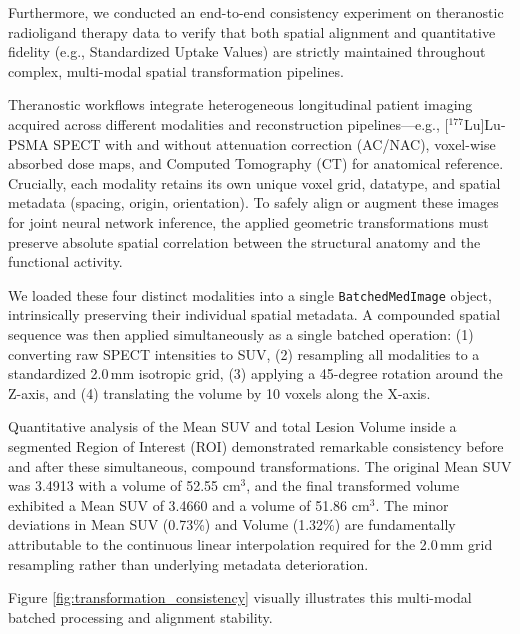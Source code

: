 \documentclass[10pt,letterpaper]{article}
\begin{document}
Furthermore, we conducted an end-to-end consistency experiment on theranostic radioligand therapy data to verify that both spatial alignment and quantitative fidelity (e.g., Standardized Uptake Values) are strictly maintained throughout complex, multi-modal spatial transformation pipelines.

Theranostic workflows integrate heterogeneous longitudinal patient imaging acquired across different modalities and reconstruction pipelines---e.g., [$^{177}$Lu]Lu-PSMA SPECT with and without attenuation correction (AC/NAC), voxel-wise absorbed dose maps, and Computed Tomography (CT) for anatomical reference. Crucially, each modality retains its own unique voxel grid, datatype, and spatial metadata (spacing, origin, orientation). To safely align or augment these images for joint neural network inference, the applied geometric transformations must preserve absolute spatial correlation between the structural anatomy and the functional activity.

We loaded these four distinct modalities into a single \texttt{BatchedMedImage} object, intrinsically preserving their individual spatial metadata. A compounded spatial sequence was then applied simultaneously as a single batched operation: (1) converting raw SPECT intensities to SUV, (2) resampling all modalities to a standardized 2.0\,mm isotropic grid, (3) applying a 45-degree rotation around the Z-axis, and (4) translating the volume by 10 voxels along the X-axis.

Quantitative analysis of the Mean SUV and total Lesion Volume inside a segmented Region of Interest (ROI) demonstrated remarkable consistency before and after these simultaneous, compound transformations. The original Mean SUV was 3.4913 with a volume of 52.55 $\text{cm}^3$, and the final transformed volume exhibited a Mean SUV of 3.4660 and a volume of 51.86 $\text{cm}^3$. The minor deviations in Mean SUV (0.73\%) and Volume (1.32\%) are fundamentally attributable to the continuous linear interpolation required for the 2.0\,mm grid resampling rather than underlying metadata deterioration.

Figure \ref{fig:transformation_consistency} visually illustrates this multi-modal batched processing and alignment stability.
\end{document}
